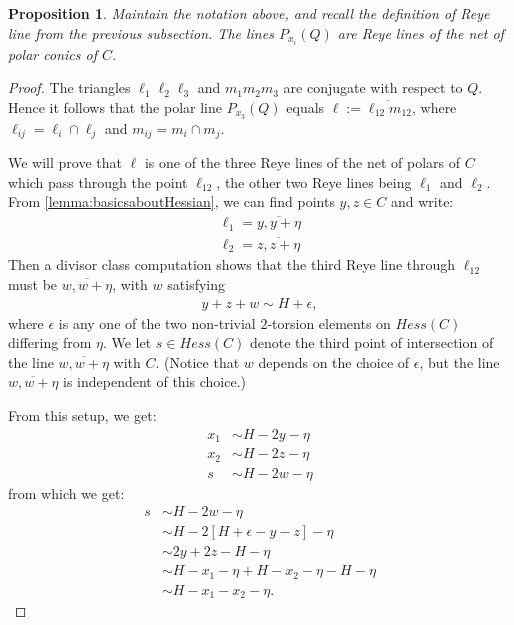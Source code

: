\documentclass[11pt,reqno]{amsart}
\theoremstyle{plain}
\newtheorem{proposition}[theorem]{Proposition}
\theoremstyle{definition}
\theoremstyle{remark}
\numberwithin{equation}{section}
\numberwithin{equation}{section}
\begin{document}
\begin{proposition}\label{proposition:importantReyeLineFact}
Maintain the notation above, and recall the definition of Reye line from the previous subsection. The lines $P_{x_{i}}(Q)$ are Reye lines of the net of polar conics of $C$.
\end{proposition}

\begin{proof}
    The triangles $\ell_{1}\ell_{2}\ell_{3}$ and $m_{1}m_{2}m_{3}$ are conjugate with respect to $Q$.  Hence it follows that the polar line $P_{x_{3}}(Q)$ equals $\ell := \overline{\ell_{12}m_{12}}$, where $\ell_{ij} = \ell_{i} \cap \ell_{j}$ and $m_{ij} = m_{i} \cap m_{j}$.
    
    We will prove that $\ell$ is one of the three Reye lines of the net of polars of $C$ which pass through the point $\ell_{12}$, the other two Reye lines being $\ell_{1}$ and $\ell_{2}$. From \autoref{lemma:basicsaboutHessian}, we can find points $y,z \in C$ and write: 
    \begin{align*}
        \ell_{1} = \overline{y, y + \eta}\\
        \ell_{2} = \overline{z, z + \eta}
    \end{align*}
Then a divisor class computation shows that the third Reye line through $\ell_{12}$ must be $\overline{w,w + \eta}$, with $w$ satisfying 
\begin{align*}
    y+z+w \sim H + \epsilon,
\end{align*}
where $\epsilon$ is any one of the two non-trivial $2$-torsion elements on $Hess(C)$ differing from $\eta$.  We let $s \in Hess(C)$ denote the third point of intersection of the line $\overline{w,w + \eta}$ with $C$. (Notice that $w$ depends on the choice of $\epsilon$, but the line $\overline{w,w + \eta}$ is independent of this choice.)

From this setup, we get: 
\begin{align*}
    x_{1} &\sim H-2y-\eta\\
    x_{2} &\sim H-2z - \eta\\
    s &\sim H-2w - \eta
\end{align*}
from which we get:
\begin{align*}
    s &\sim H-2w - \eta\\
    &\sim H - 2[H+\epsilon -y-z] - \eta\\
    &\sim 2y+2z-H-\eta\\
    &\sim H-x_{1}-\eta + H-x_{2}-\eta-H-\eta\\
    &\sim H-x_{1}-x_{2} - \eta.
\end{align*}


\end{proof}
\end{document}
